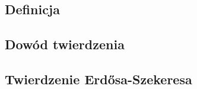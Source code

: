 \subsection{Definicja}


\subsection{Dowód twierdzenia}


\subsection{Twierdzenie Erdősa-Szekeresa}
